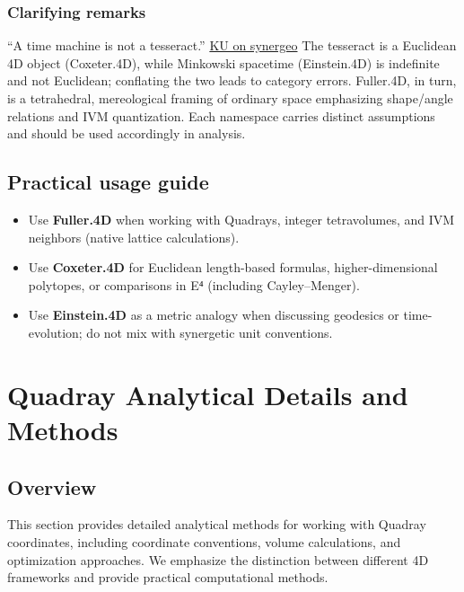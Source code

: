 \documentclass[
  10pt,
]{article}
\providecommand{\tightlist}{%
  \setlength{\itemsep}{0pt}\setlength{\parskip}{0pt}}
\begin{document}
\hypertarget{clarifying-remarks}{%
\subsubsection{Clarifying remarks}\label{clarifying-remarks}}

``A time machine is not a tesseract.''
\href{https://groups.io/g/synergeo/topic/my_take_on_close_pack/114531919}{KU
on synergeo} The tesseract is a Euclidean 4D object (Coxeter.4D), while
Minkowski spacetime (Einstein.4D) is indefinite and not Euclidean;
conflating the two leads to category errors. Fuller.4D, in turn, is a
tetrahedral, mereological framing of ordinary space emphasizing
shape/angle relations and IVM quantization. Each namespace carries
distinct assumptions and should be used accordingly in analysis.

\hypertarget{practical-usage-guide}{%
\subsection{Practical usage guide}\label{practical-usage-guide}}

\begin{itemize}
\tightlist
\item
  Use \textbf{Fuller.4D} when working with Quadrays, integer
  tetravolumes, and IVM neighbors (native lattice calculations).
\item
  Use \textbf{Coxeter.4D} for Euclidean length-based formulas,
  higher-dimensional polytopes, or comparisons in E⁴ (including
  Cayley--Menger).
\item
  Use \textbf{Einstein.4D} as a metric analogy when discussing geodesics
  or time-evolution; do not mix with synergetic unit conventions.
\end{itemize}

\newpage

\hypertarget{quadray-analytical-details-and-methods}{%
\section{Quadray Analytical Details and
Methods}\label{quadray-analytical-details-and-methods}}

\hypertarget{overview-1}{%
\subsection{Overview}\label{overview-1}}

This section provides detailed analytical methods for working with
Quadray coordinates, including coordinate conventions, volume
calculations, and optimization approaches. We emphasize the distinction
between different 4D frameworks and provide practical computational
methods.
\end{document}
